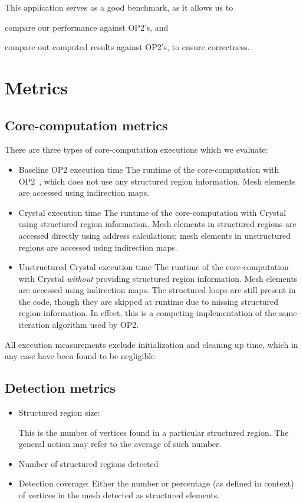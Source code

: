 This application serves as a good benchmark, as it allows us to
\begin{enumerate*}[label=\alph*)]
\item compare our performance against OP2's, and
\item compare out computed results against OP2's, to ensure correctness.
\end{enumerate*}

\section{Metrics}
\subsection{Core-computation metrics}
There are three types of core-computation executions which we evaluate:
\begin{itemize}
\item Baseline OP2 execution time
The runtime of the core-computation with OP2~\cite{op2common}, which does not use any structured region information. Mesh elements are accessed using indirection maps.

\item Crystal execution time
The runtime of the core-computation with Crystal using structured region information. Mesh elements in structured regions are accessed directly using address calculations; mesh elements in unstructured regions are accessed using indirection maps.

\item Unstructured Crystal execution time
The runtime of the core-computation with Crystal \emph{without} providing structured region information. Mesh elements are accessed using indirection maps. The structured loops are still present in the code, though they are skipped at runtime due to missing structured region information. In effect, this is a competing implementation of the same iteration algorithm used by OP2.
\end{itemize}
All execution measurements exclude initialization and cleaning up time, which in any case have been found to be negligible.

\subsection{Detection metrics}
\begin{itemize}
\item Structured region size:

This is the number of vertices found in a particular structured region. The general notion may refer to the average of such number.
\item Number of structured regions detected
\item Detection coverage: Either the number or percentage (as defined in context) of vertices in the mesh detected as structured elements.
\end{itemize}


